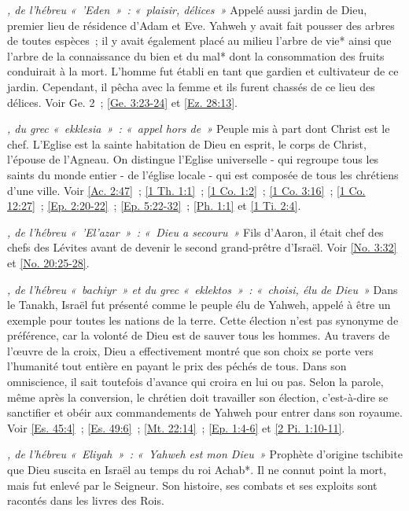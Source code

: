 \begin{multicols}{2}
\textit{, de l'hébreu «~'Eden~»~: «~plaisir, délices~»}\newline
Appelé aussi jardin de Dieu, premier lieu de résidence d'Adam et Eve. Yahweh y avait fait pousser des arbres de toutes espèces~; il y avait également placé au milieu l'arbre de vie* ainsi que l'arbre de la connaissance du bien et du mal* dont la consommation des fruits conduirait à la mort. L'homme fut établi en tant que gardien et cultivateur de ce jardin. Cependant, il pêcha avec la femme et ils furent chassés de ce lieu des délices. Voir Ge. 2~; \vref{Ge. 3:23-24} et \vref{Ez. 28:13}.

\textit{, du grec «~ekklesia~»~: «~appel hors de~»}\newline
Peuple mis à part dont Christ est le chef. L'Eglise est la sainte habitation de Dieu en esprit, le corps de Christ, l'épouse de l'Agneau. On distingue l'Eglise universelle - qui regroupe tous les saints du monde entier - de l'église locale - qui est composée de tous les chrétiens d'une ville. Voir \vref{Ac. 2:47}~; \vref{1 Th. 1:1}~; \vref{1 Co. 1:2}~; \vref{1 Co. 3:16}~; \vref{1 Co. 12:27}~; \vref{Ep. 2:20-22}~; \vref{Ep. 5:22-32}~; \vref{Ph. 1:1} et \vref{1 Ti. 2:4}.

\textit{, de l'hébreu «~'El'azar~»~: «~Dieu a secouru~»}\newline
Fils d'Aaron, il était chef des chefs des Lévites avant de devenir le second grand-prêtre d'Israël. Voir \vref{No. 3:32} et \vref{No. 20:25-28}.

\textit{, de l'hébreu «~bachiyr~» et du grec «~eklektos~»~: «~choisi, élu de Dieu~»}\newline
Dans le Tanakh, Israël fut présenté comme le peuple élu de Yahweh, appelé à être un exemple pour toutes les nations de la terre. Cette élection n'est pas synonyme de préférence, car la volonté de Dieu est de sauver tous les hommes. Au travers de l'œuvre de la croix, Dieu a effectivement montré que son choix se porte vers l'humanité tout entière en payant le prix des péchés de tous. Dans son omniscience, il sait toutefois d'avance qui croira en lui ou pas. Selon la parole, même après la conversion, le chrétien doit travailler son élection, c'est-à-dire se sanctifier et obéir aux commandements de Yahweh pour entrer dans son royaume. Voir \vref{Es. 45:4}~; \vref{Es. 49:6}~; \vref{Mt. 22:14}~; \vref{Ep. 1:4-6} et \vref{2 Pi. 1:10-11}.

\textit{, de l'hébreu «~Eliyah~»~: «~Yahweh est mon Dieu~»}\newline
Prophète d'origine tschibite que Dieu suscita en Israël au temps du roi Achab*. Il ne connut point la mort, mais fut enlevé par le Seigneur. Son histoire, ses combats et ses exploits sont racontés dans les livres des Rois.


\end{multicols}
